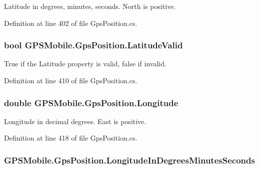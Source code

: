 Latitude in degrees, minutes, seconds. North is positive. 

Definition at line 402 of file GpsPosition.cs.\hypertarget{class_g_p_s_mobile_1_1_gps_position_ab3d2aa57c9507dffc5c8a03b78fe34e0}{
\subsubsection[{LatitudeValid}]{\setlength{\rightskip}{0pt plus 5cm}bool GPSMobile.GpsPosition.LatitudeValid}}
\label{class_g_p_s_mobile_1_1_gps_position_ab3d2aa57c9507dffc5c8a03b78fe34e0}


True if the Latitude property is valid, false if invalid. 

Definition at line 410 of file GpsPosition.cs.\hypertarget{class_g_p_s_mobile_1_1_gps_position_add38fa11bc9116c7b1fa2e071b967002}{
\subsubsection[{Longitude}]{\setlength{\rightskip}{0pt plus 5cm}double GPSMobile.GpsPosition.Longitude}}
\label{class_g_p_s_mobile_1_1_gps_position_add38fa11bc9116c7b1fa2e071b967002}


Longitude in decimal degrees. East is positive. 

Definition at line 418 of file GpsPosition.cs.\hypertarget{class_g_p_s_mobile_1_1_gps_position_a04b891a6cc52d96894fb41e03b166b81}{
\subsubsection[{LongitudeInDegreesMinutesSeconds}]{ GPSMobile.GpsPosition.LongitudeInDegreesMinutesSeconds}}
\label{class_g_p_s_mobile_1_1_gps_position_a04b891a6cc52d96894fb41e03b166b81}


